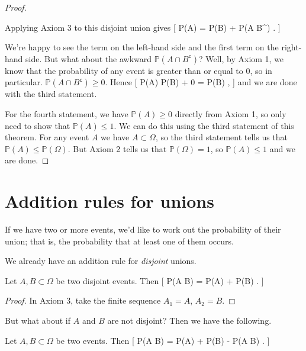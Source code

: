 \documentclass[
  letterpaper,
  DIV=11,
  numbers=noendperiod]{scrreprt}
\theoremstyle{remark}
\begin{document}
\begin{proof}
\begin{figure}
{}

\end{figure}

Applying Axiom 3 to this disjoint union gives {[} \mathbb P(A) =
\mathbb P(B) + \mathbb P(A \cap B\^{}) . {]}

We're happy to see the term on the left-hand side and the first term on
the right-hand side. But what about the awkward
\(\mathbb P(A \cap B^\mathsf{c})\)? Well, by Axiom 1, we know that the
probability of any event is greater than or equal to 0, so in
particular. \(\mathbb P(A \cap B^\mathsf{c}) \geq 0\). Hence {[}
\mathbb P(A) \geq \mathbb P(B) + 0 = \mathbb P(B) , {]} and we are done
with the third statement.

For the fourth statement, we have \(\mathbb P(A) \geq 0\) directly from
Axiom 1, so only need to show that \(\mathbb P(A) \leq 1\). We can do
this using the third statement of this theorem. For any event \(A\) we
have \(A \subset \Omega\), so the third statement tells us that
\(\mathbb P(A) \leq \mathbb P(\Omega)\). But Axiom 2 tells us that
\(\mathbb P(\Omega) = 1\), so \(\mathbb P(A) \leq 1\) and we are done.

\end{proof}

\hypertarget{addition}{%
\section{Addition rules for unions}\label{addition}}

If we have two or more events, we'd like to work out the probability of
their union; that is, the probability that at least one of them occurs.

We already have an addition rule for \emph{disjoint} unions.

Let \(A, B \subset \Omega\) be two disjoint events. Then {[} \mathbb P(A
\cup B) = \mathbb P(A) + \mathbb P(B) . {]}

\begin{proof}

In Axiom 3, take the finite sequence \(A_1 = A\), \(A_2 = B\).

\end{proof}

But what about if \(A\) and \(B\) are not disjoint? Then we have the
following.

Let \(A, B \subset \Omega\) be two events. Then {[} \mathbb P(A \cup B)
= \mathbb P(A) + \mathbb P(B) - \mathbb P(A \cap B) . {]}
\end{document}
